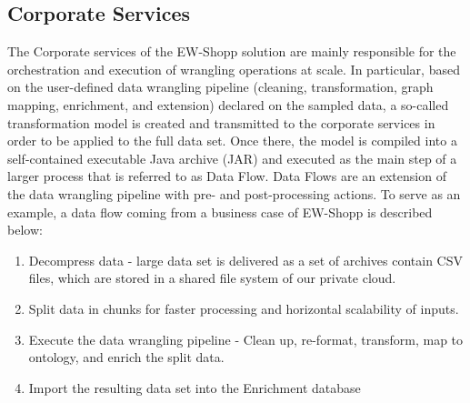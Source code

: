 \subsection{Corporate Services}\label{sec:bdr}



The Corporate services of the EW-Shopp solution are mainly responsible for the orchestration and execution of wrangling operations at scale. 
In particular, based on the user-defined data wrangling pipeline (cleaning, transformation, graph mapping, enrichment, and extension) declared on the sampled data, a so-called transformation model is created and transmitted to the corporate services in order to be applied to the full data set. Once there, the model is compiled into a self-contained executable Java archive (JAR) and executed as the main step of a larger process that is referred to as Data Flow.  
Data Flows are an extension of the data wrangling pipeline with pre- and post-processing actions. 
To serve as an example, a data flow coming from a business case of EW-Shopp is described below:
\begin{enumerate}
    \item Decompress data - large data set is delivered as a set of archives contain CSV files, which are stored in a shared file system of our private cloud.
    \item Split data in chunks for faster processing and horizontal scalability of inputs.
    \item Execute the data wrangling pipeline - Clean up, re-format, transform, map to ontology, and enrich the split data. 
    \item Import the resulting data set into the Enrichment database
\end{enumerate}



